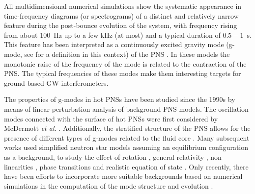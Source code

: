 
All multidimensional numerical simulations show the systematic appearance in time-frequency diagrams (or spectrograms) of a distinct and relatively narrow feature 
%
%
during the post-bounce evolution of the system, with frequency rising 
from about $100$~Hz up to a few kHz (at most) and a typical duration of $0.5-1$~s. This feature has been interpreted as a continuously excited gravity mode (g-mode, see \citep{kokkotas,Friedman:2013} for a definition in this context) of the PNS \citep{murphy:09, mueller:13gw, Cerda:2013, Yakunin:2015, Kuroda:2016, Andresen:2017}. 
In these models the monotonic raise of the frequency of the mode is related to the contraction of the PNS. The {typical} frequencies of {these} modes make them interesting targets for
ground-based GW interferometers. 
 
 The {properties of} g-modes in hot {PNSs} have been studied since the 1990s
 {by means of linear perturbation analysis of background PNS models}. The oscillation modes connected with the surface of hot PNSs were first considered by McDermott {\it et al.} \citep{McDermott:1983}. Additionally, the stratified structure of the PNS allows for the presence of different types of g-modes related to the fluid core \citep{Reisenegger:1992}. Many subsequent works used simplified neutron star models assuming an equilibrium configuration {as a background}, to study the effect of rotation \citep{Ferrari:2004}, general relativity \citep{Passamonti:2005}, non-linearities \citep{Dimmelmeier:2006}, phase transitions \citep{Kruger:2015} and realistic equation of state \citep{Camelio:2017}. {Only recently, there have been efforts to incorporate more suitable backgrounds based on numerical simulations in the computation of the mode structure and evolution \citep{Sotani:2016,Torres:2018, Morozova:2018, Torres:2019a,Torres:2019b,Sotani:2019,WS:2019,Sotani:2020a, Sotani:2020b}}.
 
